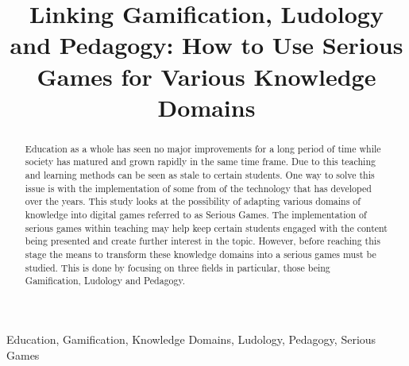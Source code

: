 \documentclass[conference]{IEEEtran}
\begin{document}
\title{Linking Gamification, Ludology and Pedagogy: How to Use Serious Games for Various Knowledge Domains\\

}

\author{
\and


}

\maketitle

\begin{abstract}
Education as a whole has seen no major improvements for a long period of time while society has matured and grown rapidly in the same time frame. Due to this teaching and learning methods can be seen as stale to certain students. One way to solve this issue is with the implementation of some from of the technology that has developed over the years. This study looks at the possibility of adapting various domains of knowledge into digital games referred to as Serious Games. The implementation of serious games within teaching may help keep certain students engaged with the content being presented and create further interest in the topic. However, before reaching this stage the means to transform these knowledge domains into a serious games must be studied. This is done by focusing on three fields in particular, those being Gamification, Ludology and Pedagogy.
\end{abstract}

\begin{IEEEkeywords}
Education, Gamification, Knowledge Domains, Ludology, Pedagogy, Serious Games
\end{IEEEkeywords}
\end{document}
